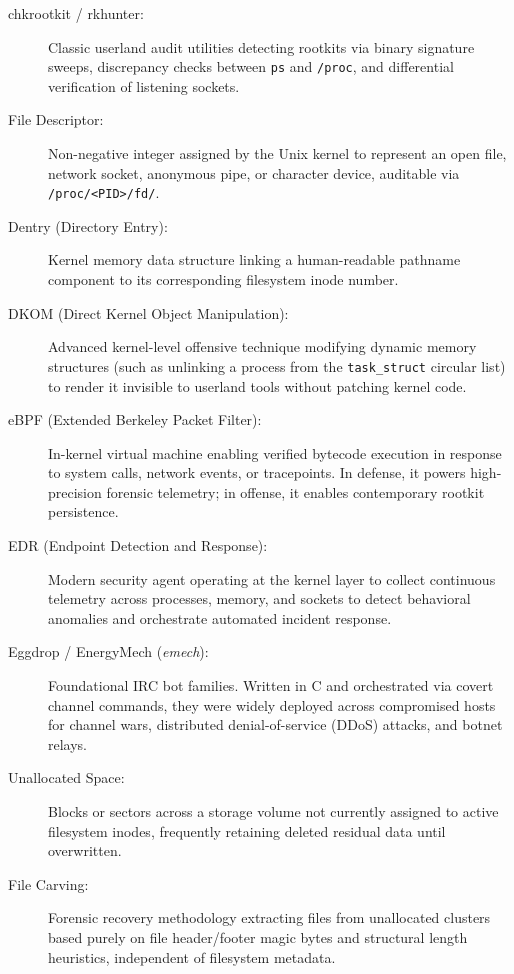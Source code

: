 \begin{description}
    \item[chkrootkit / rkhunter:] Classic userland audit utilities detecting rootkits via binary signature sweeps, discrepancy checks between \texttt{ps} and \texttt{/proc}, and differential verification of listening sockets.

    \item[File Descriptor:] Non-negative integer assigned by the Unix kernel to represent an open file, network socket, anonymous pipe, or character device, auditable via \texttt{/proc/<PID>/fd/}.

    \item[Dentry (Directory Entry):] Kernel memory data structure linking a human-readable pathname component to its corresponding filesystem inode number.

    \item[DKOM (Direct Kernel Object Manipulation):] Advanced kernel-level offensive technique modifying dynamic memory structures (such as unlinking a process from the \texttt{task\_struct} circular list) to render it invisible to userland tools without patching kernel code.

    \item[eBPF (Extended Berkeley Packet Filter):] In-kernel virtual machine enabling verified bytecode execution in response to system calls, network events, or tracepoints. In defense, it powers high-precision forensic telemetry; in offense, it enables contemporary rootkit persistence.

    \item[EDR (Endpoint Detection and Response):] Modern security agent operating at the kernel layer to collect continuous telemetry across processes, memory, and sockets to detect behavioral anomalies and orchestrate automated incident response.

    \item[Eggdrop / EnergyMech (\textit{emech}):] Foundational IRC bot families. Written in C and orchestrated via covert channel commands, they were widely deployed across compromised hosts for channel wars, distributed denial-of-service (DDoS) attacks, and botnet relays.

    \item[Unallocated Space:] Blocks or sectors across a storage volume not currently assigned to active filesystem inodes, frequently retaining deleted residual data until overwritten.

    \item[File Carving:] Forensic recovery methodology extracting files from unallocated clusters based purely on file header/footer magic bytes and structural length heuristics, independent of filesystem metadata.


\end{description}
